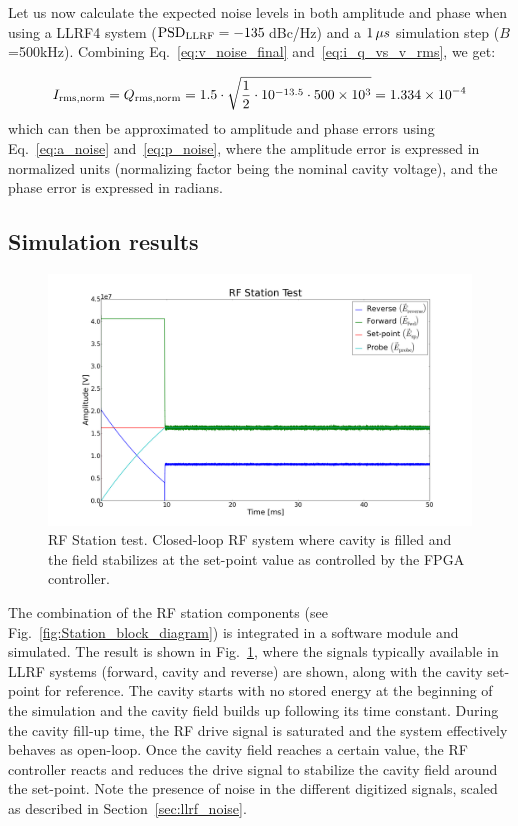 \documentclass[a4paper,12pt]{article}
\begin{document}
Let us now calculate the expected noise levels in both amplitude and phase when using a LLRF4 system (${\rm PSD}_{\rm LLRF}=-135\thinspace$dBc/Hz) and a $1\thinspace\mu s$ simulation step ($B$=500\thinspace kHz). Combining Eq.~\eqref{eq:v_noise_final} and~\ref{eq:i_q_vs_v_rms}, we get:

\begin{equation}
   I_{\rm rms,norm} = Q_{\rm rms,norm} =  1.5 \cdot \sqrt{\frac{1}{2} \cdot 10^{-13.5} \cdot 500 \times 10^3}= 1.334\times 10^{-4}
\end{equation}
which can then be approximated to amplitude and phase errors using Eq.~\eqref{eq:a_noise} and~\eqref{eq:p_noise}, where the amplitude error is expressed in normalized units (normalizing factor being the nominal cavity voltage), and the phase error is expressed in radians.

\subsection{Simulation results}

\begin{figure}
\centering
\includegraphics[scale=0.25]{../figures/rf_station_test.png}
\caption{RF Station test. Closed-loop RF system where cavity is filled and the field stabilizes at the set-point value as controlled by the FPGA controller.}
\label{fig:rf_test_step}
\end{figure}

The combination of the RF station components (see Fig.~\ref{fig:Station_block_diagram}) is integrated in a software module and simulated. The result is shown in Fig.~\ref{fig:rf_test_step}, where the signals typically available in LLRF systems (forward, cavity and reverse) are shown, along with the cavity set-point for reference. The cavity starts with no stored energy at the beginning of the simulation and the cavity field builds up following its time constant. During the cavity fill-up time, the RF drive signal is saturated and the system effectively behaves as open-loop. Once the cavity field reaches a certain value, the RF controller reacts and reduces the drive signal to stabilize the cavity field around the set-point. Note the presence of noise in the different digitized signals, scaled as described in Section~\ref{sec:llrf_noise}.
\end{document}
